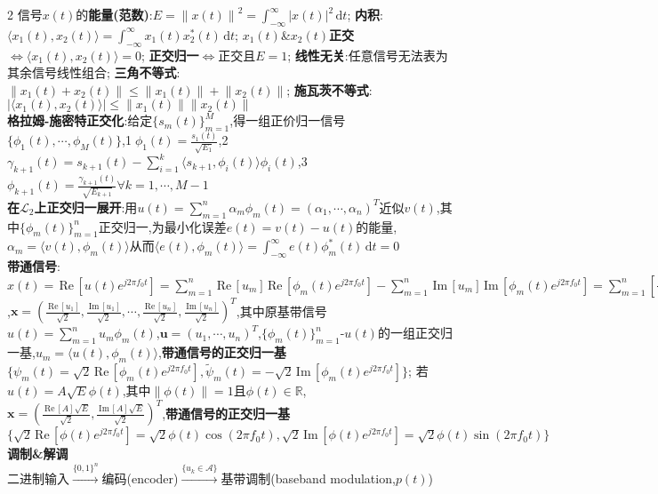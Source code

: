 \documentclass[UTF8,a4paper,10pt]{article}
\providecommand{\abs}[1]{\left\lvert#1\right\rvert}
\providecommand{\norm}[1]{\left\lVert#1\right\rVert}
\providecommand{\re}{\,\mathrm{Re}\,}
\providecommand{\im}{\,\mathrm{Im}\,}
\begin{document}
\begin{multicols*}{2}
信号$x(t)$的\textbf{能量(范数)}:$E=\norm{x(t)}^2=\int_{-\infty}^{\infty}\abs{x(t)}^2\,\mathrm{d}t$;%
    \textbf{内积}:$\langle x_1(t),x_2(t)\rangle=\int_{-\infty}^{\infty}x_1(t)x_2^*(t)\,\mathrm{d}t$;%
    $x_1(t)$\&$x_2(t)$\textbf{正交}$\Leftrightarrow\langle x_1(t),x_2(t)\rangle=0$;%
    \textbf{正交归一}$\Leftrightarrow$正交且$E=1$;%
    \textbf{线性无关}:任意信号无法表为其余信号线性组合;%
    \textbf{三角不等式}:$\norm{x_1(t)+x_2(t)}\leq\norm{x_1(t)}+\norm{x_2(t)}$;%
    \textbf{施瓦茨不等式}:$\abs{\langle x_1(t),x_2(t)\rangle}\leq\norm{x_1(t)}\norm{x_2(t)}$\\
\textbf{格拉姆-施密特正交化}:给定$\{s_m(t)\}_{m=1}^M$,得一组正价归一信号$\{\phi_1(t),\cdots,\phi_M(t)\}$,\textcircled{1}$\phi_1(t)=\frac{s_1(t)}{\sqrt{E_1}}$,\textcircled{2}$\gamma_{k+1}(t)=s_{k+1}(t)-\sum_{i=1}^k\langle s_{k+1},\phi_i(t)\rangle\phi_i(t)$,\textcircled{3}$\phi_{k+1}(t)=\frac{\gamma_{k+1}(t)}{\sqrt{E_{k+1}}}\forall k=1,\cdots,M-1$\\
\textbf{在$\mathcal{L}_2$上正交归一展开}:用$u(t)=\sum_{m=1}^n\alpha_m\phi_m(t)=(\alpha_1,\cdots,\alpha_n)^T$近似$v(t)$,其中$\{\phi_m(t)\}_{m=1}^n$正交归一,为最小化误差$e(t)=v(t)-u(t)$的能量,$\alpha_m=\langle v(t),\phi_m(t)\rangle$从而$\langle e(t),\phi_m(t)\rangle=\int_{-\infty}^{\infty}e(t)\phi_m^*(t)\,\mathrm{d}t=0$\\
\textbf{带通信号}:$x(t)=\re[u(t)e^{j2\pi f_0t}]=\sum_{m=1}^n\re[u_m]\re[\phi_m(t)e^{j2\pi f_0t}]-\sum_{m=1}^n\im[u_m]\im[\phi_m(t)e^{j2\pi f_0t}]=\sum_{m=1}^n[\frac{\re[u_m]}{\sqrt{2}}\psi_m(t)+\frac{\im[u_m]}{\sqrt{2}}\tilde{\psi}_m(t)]$,$\bm{x}=(\frac{\re[u_1]}{\sqrt{2}},\frac{\im[u_1]}{\sqrt{2}},\cdots,\frac{\re[u_n]}{\sqrt{2}},\frac{\im[u_n]}{\sqrt{2}})^T$,其中原基带信号$u(t)=\sum_{m=1}^nu_m\phi_m(t)$,$\bm{u}=(u_1,\cdots,u_n)^T$,$\{\phi_m(t)\}_{m=1}^n$-$u(t)$的一组正交归一基,$u_m=\langle u(t),\phi_m(t)\rangle$,\textbf{带通信号的正交归一基}$\{\psi_m(t)=\sqrt{2}\re[\phi_m(t)e^{j2\pi f_0t}],\tilde{\psi}_m(t)=-\sqrt{2}\im[\phi_m(t)e^{j2\pi f_0t}]\}$;
    若$u(t)=A\sqrt{E}\phi(t)$,其中$\norm{\phi(t)}=1$且$\phi(t)\in\mathbb{R}$,$\bm{x}=(\frac{\re[A]\sqrt{E}}{\sqrt{2}},\frac{\im[A]\sqrt{E}}{\sqrt{2}})^T$,\textbf{带通信号的正交归一基}$\{\sqrt{2}\re[\phi(t)e^{j2\pi f_0t}]=\sqrt{2}\phi(t)\cos(2\pi f_0t),\sqrt{2}\im[\phi(t)e^{j2\pi f_0t}]=\sqrt{2}\phi(t)\sin(2\pi f_0t)\}$\\
\textbf{调制\&解调}\hrulefill\\
二进制输入$\overset{\{0,1\}^n}{\rightarrow}$编码(encoder)$\overset{\{u_k\in\mathcal{A}\}}{\rightarrow}$基带调制(baseband modulation,$p(t)$)\\

\end{multicols*}
\end{document}
